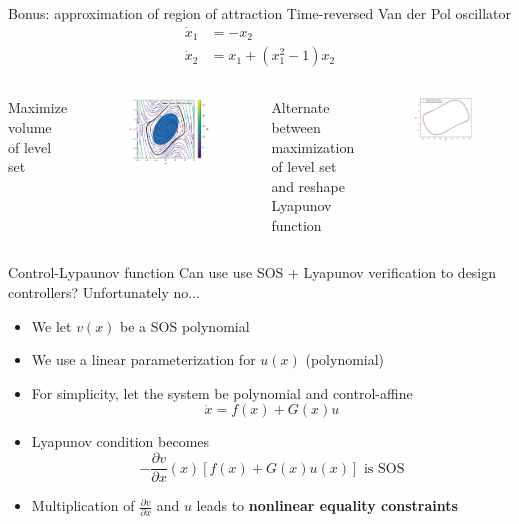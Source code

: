 \documentclass[aspectratio=169]{beamer}
\begin{document}
\begin{frame}{Bonus: approximation of region of attraction}
Time-reversed Van der Pol oscillator
\begin{align*}
\dot x_1 &= - x_2 \\
\dot x_2 &= x_1 + (x_1^2 - 1) x_2
\end{align*}
\begin{columns}
Maximize volume of level set
\begin{figure}[h]
\includegraphics[width=.5\columnwidth]{figures/van_der_pol_roa_quadratic.pdf}
\end{figure}
Alternate between maximization of level set and reshape Lyapunov function
\begin{figure}[h]
\includegraphics[width=.55\columnwidth]{figures/van_der_pol_roa.png}
\end{figure}
\end{columns}
\end{frame}

\begin{frame}{Control-Lypaunov function}
Can use use SOS + Lyapunov verification to design controllers? Unfortunately no...
\begin{itemize}
\item
We let $v(x)$ be a SOS polynomial
\item
We use a linear parameterization for $u(x)$ (polynomial)
\item
For simplicity, let the system be polynomial and control-affine
$$
\dot x = f(x) + G(x) u
$$
\item
Lyapunov condition becomes
$$
- \frac{\partial v}{\partial x}(x) [f(x) + G(x) u(x)] \text{ is SOS}
$$
\item
Multiplication of $\frac{\partial v}{\partial x}$ and $u$ leads to \textbf{nonlinear equality constraints}
\end{itemize}
\end{frame}
\end{document}
